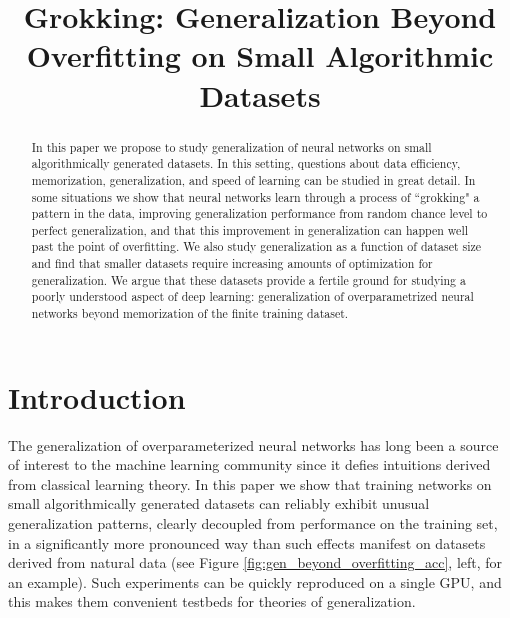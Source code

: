 \documentclass{article} %
\title{Grokking: Generalization Beyond Overfitting on Small Algorithmic Datasets}
\author{\and
Alethea Power, Yuri Burda, Harri Edwards, Igor Babuschkin\\
OpenAI\\
\and
Vedant Misra\thanks{Vedant was at OpenAI at the time of this work}\\
Google\\
}
\begin{document}
\maketitle

\begin{abstract}
In this paper we propose to study generalization of neural networks on small algorithmically generated datasets. In this setting, questions about data efficiency, memorization, generalization, and speed of learning can be studied in great detail. In some situations we show that neural networks learn through a process of ``grokking" a pattern in the data, improving generalization performance from random chance level to perfect generalization, and that this improvement in generalization can happen well past the point of overfitting. We also study generalization as a function of dataset size and find that smaller datasets require increasing amounts of optimization for generalization. We argue that these datasets provide a fertile ground for studying a poorly understood aspect of deep learning: generalization of overparametrized neural networks beyond memorization of the finite training dataset.
\end{abstract}

\section{Introduction}
\label{introduction}


The generalization of overparameterized neural networks has long been a source of interest to the machine learning community since it defies intuitions derived from classical learning theory. In this paper we show that training networks on small algorithmically generated datasets can reliably exhibit unusual generalization patterns, clearly decoupled from performance on the training set, in a significantly more pronounced way than such effects manifest on datasets derived from natural data (see Figure \ref{fig:gen_beyond_overfitting_acc}, left, for an example). Such experiments can be quickly reproduced on a single GPU, and this makes them convenient testbeds for theories of generalization.
\end{document}
